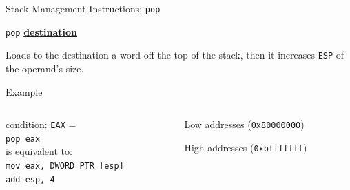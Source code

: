 \documentclass[]{beamer}
\begin{document}
\begin{frame}[fragile]{Stack Management Instructions: {\tt pop}}
	\par\noindent{}
	\centerline{{\tt pop} \underline{{\bf destination}}}
	\par\noindent Loads to the destination a word off the top of the stack, then it increases {\tt ESP} of the operand's size.

	\begin{block}{Example}
	\begin{columns}
	\begin{column}{0.45\textwidth}
	 condition: {\tt EAX} =  \\[.5em]
	{\tt pop eax} \\[1em]
	is equivalent to: \\[1em]
	\alert<2>{{\tt mov eax, DWORD PTR [esp]} \\}
	\alert<3>{{\tt add esp, 4} \\}
	\end{column}
	
	\begin{column}{0.4\textwidth}
		\centering\par
		{\scriptsize Low addresses ({\tt 0x80000000})}\\[.5em]
		\begin{drawstack}[scale=0.7]
		\cell{}
		\end{drawstack}
		{\scriptsize High addresses ({\tt 0xbfffffff})}
	\end{column}	
	\end{columns}
	\end{block}
\end{frame}
\end{document}
